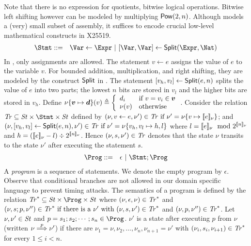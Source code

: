 Note that there is no expression for quotients, bitwise logical
operations. Bitwise left shifting however can be modeled by
multiplying $\mbox{\textsf{Pow}}(2, n)$. Although \mydsl models a (very) 
small subset of assembly, it suffices to encode crucial low-level
mathematical constructs in X25519.
\begin{eqnarray*}
  \Stmt & ::= & \Var \leftarrow \Expr
            \ |\  \concat{\Var}{\Var} \leftarrow \dslcode{Split} (\Expr, \Nat)
\end{eqnarray*}
In \mydsl, only assignments are allowed.
The statement $v \leftarrow e$ assigns the value of $e$
to the variable $v$. For bounded addition, multiplication, and right
shifting, they are modeled by the construct $\mbox{\textsf{Split}}$ in \mydsl.
The statement ${[}{v_h}, {v_l}{]} \leftarrow
\mbox{\textsf{Split}}(e, n)$ splits the value of $e$ into two parts;
the lowest $n$ bits are stored in $v_l$ and the higher bits
are stored in $v_h$. Define
$
\nu\mymapsto{\vv}{\vd}(v) \defn
\left\{
   \begin{array}{ll}
     d_i & \textmd{if $v = v_i \in \vv$}\\
     \nu(v) & \textmd{otherwise}
   \end{array}
\right.
$.
Consider the relation $\Tr \subseteq \St \times \Stmt \times \St$ defined
by $(\nu, v \leftarrow e, \nu') \in \mathit{Tr} \textmd{ if }
  \nu' = \nu\{{v} \mapsto {[\![{e}]\!]_{\nu}}\}$; and
  $(\nu, {[}{v_h}, {v_l}{]} \leftarrow \mbox{\textsf{Split}} (e, n), \nu') \in
  \mathit{Tr} \textmd{ if }
  \nu' = \nu\{{v_h, v_l} \mapsto {h, l}\}$
where
$l = [\![{e}]\!]_{\nu} \mod 2^{[\![{n}]\!]_{\nu}}$ and
$h = ([\![{e}]\!]_{\nu} - l) \div 2^{[\![{n}]\!]_{\nu}}$.
Hence $(\nu, s, \nu') \in \mathit{Tr}$ denotes that the state $\nu$ transits to 
the state $\nu'$ after executing the statement $s$.
\begin{eqnarray*}
  \Prog & ::= & \epsilon \ |\ \Stmt; \Prog
\end{eqnarray*}
A \emph{program} is a sequence of statements. We denote the empty program by 
$\epsilon$. Observe that conditional branches are not allowed in our
domain specific language to prevent timing attacks. The semantics of a
program is defined by the relation 
$\Tr^* \subseteq \St \times \Prog \times \St$ where
$(\nu, \epsilon, \nu) \in \mathit{Tr}^*$ and
$(\nu, s; p, \nu'') \in \mathit{Tr}^* \textmd{ if }
    \textmd{there is a } \nu' \textmd{ with }
    (\nu, s, \nu') \in \mathit{Tr}^*$ and
    $(\nu, p, \nu'') \in \mathit{Tr}^*$.
Let $\nu, \nu' \in \mathit{St}$ and $p = s_1; s_2; \cdots; s_n \in
\Prog$. $\nu'$ is a state after executing $p$ from $\nu$
(written $\nu \overset{p}{\Longrightarrow} \nu'$) if there are $\nu_1 = \nu, \nu_2,
\ldots, \nu_n, \nu_{n+1} = \nu'$ with $(\nu_i, s_i, \nu_{i+1}) \in
\mathit{Tr}^*$ for every $1 \leq i < n$.

